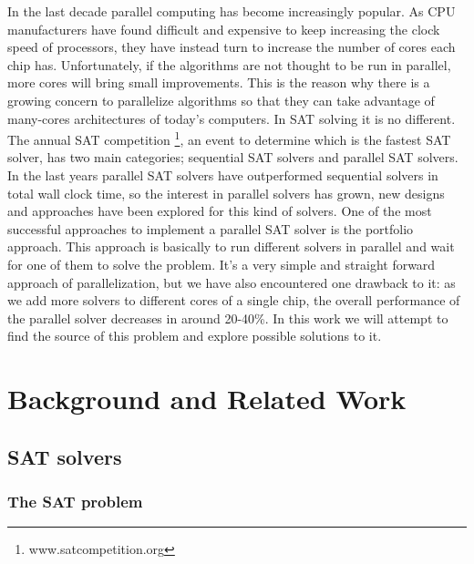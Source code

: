 \documentclass[12pt]{diicc}
\begin{document}
In the last decade parallel computing has become increasingly popular. As CPU manufacturers have found difficult and expensive to keep increasing the clock speed of processors, they have instead turn to increase the number of cores each chip has. Unfortunately, if the algorithms are not thought to be run in parallel, more cores will bring small improvements. This is the reason why there is a growing concern to parallelize algorithms so that they can take advantage of many-cores architectures of today's computers. In SAT solving it is no different. The annual SAT competition \footnote[1]{www.satcompetition.org}, an event to determine which is the fastest SAT solver, has two main categories; sequential SAT solvers and parallel SAT solvers. In the last years parallel SAT solvers have outperformed sequential solvers in total wall clock time, so the interest in parallel solvers has grown, new designs and approaches have been explored for this kind of solvers. One of the most successful approaches to implement a parallel SAT solver is the portfolio approach. This approach is basically to run different solvers in parallel and wait for one of them to solve the problem. It's a very simple and straight forward approach of parallelization, but we have also encountered one drawback to it: as we add more solvers to different cores of a single chip, the overall performance of the parallel solver decreases in around 20-40\%. In this work we will attempt to find the source of this problem and explore possible solutions to it. 




%
% 
\chapter{Background and Related Work}\label{chap:background}
\section{SAT solvers}

\subsection{The SAT problem}
\end{document}
